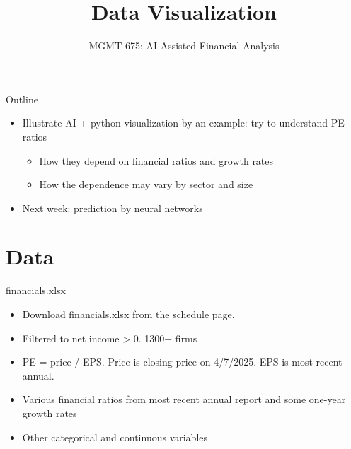 \documentclass[10pt]{beamer}
\title{Data Visualization}
\subtitle{MGMT 675: AI-Assisted Financial Analysis}
\date{}
\begin{document}
\begin{frame}[plain]
\titlepage
\end{frame}

\begin{frame}{Outline}
\begin{itemize}
\item Illustrate AI + python visualization by an example: try to understand PE ratios
\begin{itemize}
\item How they depend on financial ratios and growth rates
\item How the dependence may vary by sector and size 
\end{itemize}
\item Next week: prediction by neural networks
\end{itemize}
\end{frame}

\section{Data}

\begin{frame}{financials.xlsx}
\begin{itemize}
\item Download financials.xlsx from the schedule page.
\item Filtered to net income > 0. 1300+ firms
\item PE = price / EPS.  Price is closing price on 4/7/2025.  EPS is most recent annual. 
\item Various financial ratios from most recent annual report and some one-year growth rates 
\item Other categorical and continuous variables
\end{itemize}
\end{frame}
\end{document}
